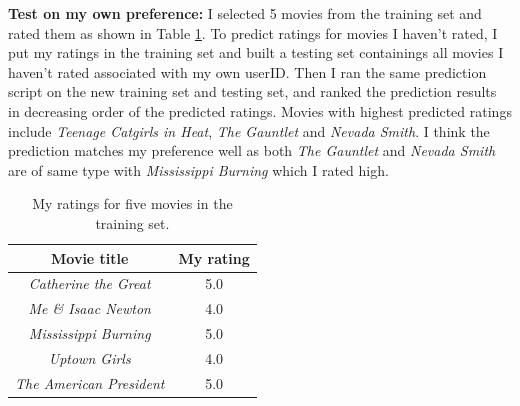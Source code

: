 \textbf{Test on my own preference:} I selected 5 movies from
the training set and rated them as shown in Table
\ref{tab:preference}. To predict ratings for movies I
haven't rated, I put my ratings in the training set and
built a testing set containings all movies I haven't rated
associated with my own userID. Then I ran the same prediction script on the new
training set and testing set, and ranked the prediction
results in decreasing order of the predicted ratings. Movies
with highest predicted ratings include \textit{Teenage
  Catgirls in Heat}, \textit{The Gauntlet} and
\textit{Nevada Smith}. I think the prediction matches my
preference well as both \textit{The Gauntlet} and
\textit{Nevada Smith} are of same type with
\textit{Mississippi Burning} which I rated high.

\begin{table}[!ht]
  \centering
  \begin{tabular}{c c}
    Movie title & My rating \\
    \hline
    \textit{Catherine the Great} & 5.0 \\
    \textit{Me \& Isaac Newton} & 4.0 \\
    \textit{Mississippi Burning} & 5.0 \\
    \textit{Uptown Girls} & 4.0 \\
    \textit{The American President} & 5.0\\
  \end{tabular}
  \caption{My ratings for five movies in the training set.}
  \label{tab:preference}
\end{table}
